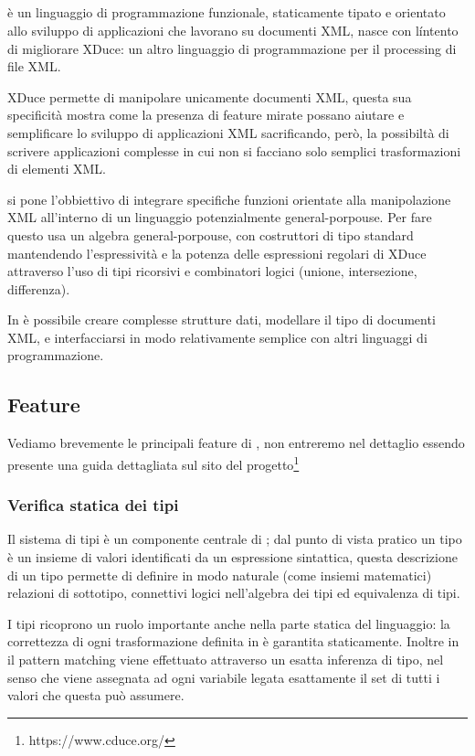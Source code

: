 \subsection{\cduce}
\cduce è un linguaggio di programmazione funzionale, staticamente tipato e orientato allo sviluppo di applicazioni che lavorano su documenti XML\cite{cduceLanguage}, nasce con líntento di migliorare XDuce: un altro linguaggio di programmazione per il processing di file XML\cite{hosoya2003xduce}. 

XDuce permette di manipolare unicamente documenti XML, questa sua specificità mostra come la presenza di feature mirate possano aiutare e semplificare lo sviluppo di applicazioni XML sacrificando, però, la possibiltà di scrivere applicazioni complesse in cui non si facciano solo semplici trasformazioni di elementi XML.

\cduce si pone l'obbiettivo di integrare specifiche funzioni orientate alla manipolazione XML all'interno di un linguaggio potenzialmente general-porpouse. Per fare questo \cduce usa un algebra general-porpouse, con costruttori di tipo standard mantendendo l'espressività e la potenza delle espressioni regolari di XDuce attraverso l'uso di tipi ricorsivi e combinatori logici (unione, intersezione, differenza).

In \cduce è possibile creare complesse strutture dati, modellare il tipo di documenti XML, e interfacciarsi in modo relativamente semplice con altri linguaggi di programmazione\cite{cduceLanguage}.
\subsection{Feature}\label{fature_cduce}
Vediamo brevemente le principali feature di \cduce, non entreremo nel dettaglio essendo presente una guida dettagliata sul sito del progetto\footnote{https://www.cduce.org/}
\subsubsection{Verifica statica dei tipi}
Il sistema di tipi è un componente centrale di \cduce; dal punto di vista pratico un tipo è un insieme di valori identificati da un espressione sintattica, questa descrizione di un tipo permette di definire in modo naturale (come insiemi matematici) relazioni di sottotipo, connettivi logici nell'algebra dei tipi ed equivalenza di tipi.

I tipi ricoprono un ruolo importante anche nella parte statica del linguaggio: la correttezza di ogni trasformazione definita in \cduce è garantita staticamente. Inoltre in \cduce il pattern matching viene effettuato attraverso un esatta inferenza di tipo, nel senso che viene assegnata ad ogni variabile legata esattamente il set di tutti i valori che questa può assumere.

